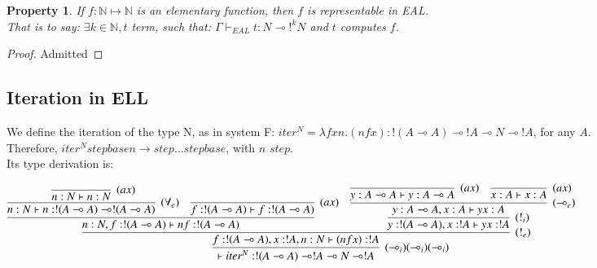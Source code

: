 \documentclass[a4paper,10pt]{article}
\newcommand{\limpl}{\multimap}  %
\newcommand{\Nset}{\mathbb{N}} %
\newtheorem{prop}{Property}
\begin{document}
\begin{prop}
	If $f: \Nset \mapsto \Nset$ is an elementary function, then $f$ is representable in EAL.\\
	That is to say: $\exists k \in \Nset, t$ term, such that: $\Gamma \vdash_{EAL} t: N \limpl !^{k} N$ and $t$ computes $f$.
\end{prop}
\begin{proof}
	Admitted
\end{proof}


\subsection{Iteration in ELL}

 We define the iteration of the type N, as in system F: $iter^N = \lambda f x n. (n f x) : !(A \limpl A) \limpl !A \limpl N \limpl !A$, for any $A$.\\
Therefore, $iter^N step base n \rightarrow step \dots step base$, with $n$ $step$.\\
Its type derivation is:
\begin{center}
$	\infer[(\limpl_i) (\limpl_i) (\limpl_i)]{\vdash iter^N: !(A \limpl A) \limpl !A \limpl N \limpl !A}{
		\infer[(!_e)]{f:!(A \limpl A), x:!A, n:N \vdash (n f x): !A}{
			\infer{n:N, f:!(A \limpl A) \vdash n f: !(A \limpl A)}{
				\infer[(\forall_e)]{n:N \vdash n: !(A\limpl A) \limpl !(A \limpl A)}{
					\infer[(ax)]{n:N \vdash n:N}{}
				}
				&
				\infer[(ax)]{f:!(A\limpl A) \vdash f:!(A\limpl A)}{}
			}
			&
			\infer[(!_i)]{y:!(A\limpl A), x:!A \vdash y x:!A}{
				\infer[(\limpl_e)]{y:A\limpl A, x:A \vdash y x:A}{
					\infer[(ax)]{y:A\limpl A \vdash y:A \limpl A}{}
					&
					\infer[(ax)]{x:A \vdash x:A}{}
				}
			}
		}
	}$
\end{center}
\end{document}
